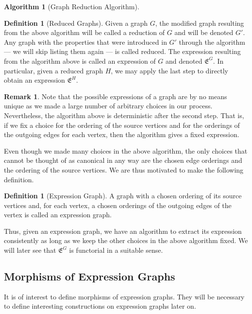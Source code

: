 \documentclass{amsart}
\newcommand{\Exp}[1]{\mathfrak{E}^{#1}}
\numberwithin{thm}{section}
\theoremstyle{definition}
\newtheorem{defn}[thm]{Definition}
\newtheorem{rmk}[thm]{Remark}
\newtheorem{alg}[thm]{Algorithm}
\begin{document}
\begin{alg}[Graph Reduction Algorithm]
\begin{enumerate}
\end{enumerate}
\end{alg}

\begin{defn}[Reduced Graphs]
Given a graph $G$, the modified graph resulting from the above algorithm will be
called a reduction of $G$ and will be denoted $G'$.
Any graph with the properties that were introduced in $G'$ through the
algorithm --- we will skip listing them again --- is called reduced.
The expression resulting from the algorithm above is called
an expression of $G$ and denoted $\Exp{G}$. In particular, given a reduced
graph $H$, we may apply the last step to directly obtain an expression
$\Exp{H}$.
\end{defn}

\begin{rmk}
Note that the possible expressions of a graph are by no means unique as
we made a large number of arbitrary choices in our process. Nevertheless, the
algorithm above is deterministic after the second step.
That is, if we fix a choice for the ordering of the source vertices and for the
orderings of the outgoing edges for each vertex, then the algorithm gives a
fixed expression.
\end{rmk}

Even though we made many choices in the above algorithm, the only
choices that cannot be thought of as canonical in any way are the chosen edge
orderings and the ordering of the source vertices. We are thus motivated to make
the following definition.

\begin{defn}[Expression Graph]
A graph with a chosen ordering of its source vertices and,
for each vertex, a chosen orderings of the outgoing edges of the vertex 
is called an expression graph.
\end{defn}

Thus, given an expression graph, we have an algorithm to extract its expression
consistently as long as we keep the other choices in the above algorithm fixed.
We will later see that $\Exp{G}$ is functorial in a suitable sense.

%

\subsection{Morphisms of Expression Graphs}

It is of interest to define morphisms of expression graphs. They will be
necessary to define interesting constructions on expression graphs later on.
\end{document}
